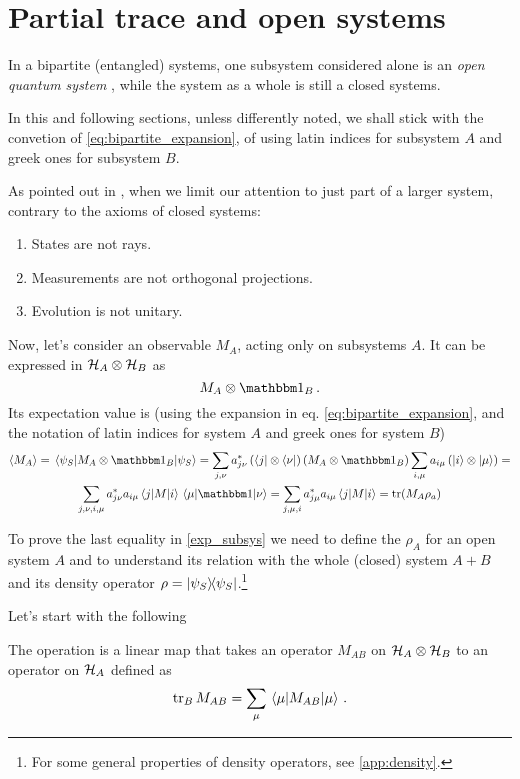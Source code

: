 \section{Partial trace and open systems}
\label{sec:p_tr}

In a bipartite (entangled) systems, one subsystem considered alone is an
\emph{open quantum system} \parencite{open_systems},
while the system as a whole is still a closed systems.

In this and following sections, unless differently noted,
we shall stick with the convetion of \eqref{eq:bipartite_expansion},
of using
latin indices for subsystem $A$ and greek ones for subsystem $B$.

As pointed out in
\cite[sec. 2.3.1]{PreskillNotes}, when we limit our attention to
just part of a larger system, contrary to the axioms of closed systems:
\begin{enumerate}
  \item States are not rays.
  \item Measurements are not orthogonal projections.
  \item Evolution is not unitary.
\end{enumerate}

Now, let's consider an observable $M_A$, acting only on subsystems $A$.
It can be expressed in $\mathcal{H}_A \otimes \mathcal{H}_B$ as
\[
  M_A \otimes \idop_B\, .
\]
Its expectation value is
(using the expansion in eq. \ref{eq:bipartite_expansion},
and the notation of latin indices for system $A$ and greek ones for system $B$)
\begin{multline}\label{exp_subsys}
  \expval{M_A} = \matrixel{\psi_S}{M_A\otimes\idop_B}{\psi_S} =
  \sum_{j,\nu}a^{*}_{j\nu}\left(\bra{j}\otimes\bra{\nu}\right)\left(M_A\otimes\idop_B\right)\sum_{i,\mu}a_{i\mu}\left(\ket{i}\otimes\ket{\mu}\right) = \\
  \sum_{j,\nu,i,\mu}a^{*}_{j\nu}a_{i\mu}\matrixel{j}{M}{i}\matrixel{\mu}{\idop}{\nu} =
  \sum_{j,\mu,i}a^{*}_{j\mu}a_{i\mu}\matrixel{j}{M}{i} =
  \tr(M_A\rho_a)
\end{multline}

To prove the last equality in \eqref{exp_subsys} we need to define the
 $\rho_A$ for an open system $A$ and to understand its
relation with the whole (closed) system $A+B$
and its density operator $\rho = \ketbra{\psi_S}{\psi_S}$.\footnote{
  For some general properties of density operators, see \ref{app:density}.
}

Let's start with the following
\begin{definition}\label{def:pTr}
  The  operation
  is a linear map
  that takes an operator
  $M_{AB}$ on $\mathcal{H}_A \otimes \mathcal{H}_B$
  to an operator on $\mathcal{H}_A$ defined as
  \[
    \tr_B M_{AB} = \sum_{\mu} \matrixel{\mu}{M_{AB}}{\mu}
    \, .
  \]
\end{definition}

